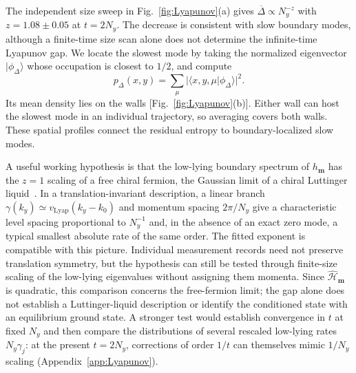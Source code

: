 \documentclass[aps,prb,10pt,twocolumn,superscriptaddress,longbibliography,floatfix]{revtex4-2}
\newcommand{\rec}{\mathbf m}   %
\begin{document}
{The independent size sweep in Fig.~\ref{fig:Lyapunov}(a) gives $\overline\Delta\propto N_y^{-z}$ with $z=1.08\pm0.05$ at $t=2N_y$. The decrease is consistent with slow boundary modes, although a finite-time size scan alone does not determine the infinite-time Lyapunov gap. We locate the slowest mode by taking the normalized eigenvector $|\phi_{\Delta}\rangle$ whose occupation is closest to $1/2$, and compute
\begin{equation}
 p_{\Delta}(x,y)=\sum_\mu|\langle x,y,\mu|\phi_{\Delta}\rangle|^2.
 \label{eq:SlowestModeDensity}
\end{equation}
Its mean density lies on the walls [Fig.~\ref{fig:Lyapunov}(b)]. Either wall can host the slowest mode in an individual trajectory, so averaging covers both walls. These spatial profiles connect the residual entropy to boundary-localized slow modes.

A useful working hypothesis is that the low-lying boundary spectrum of $h_{\rec}$ has the $z=1$ scaling of a free chiral fermion, the Gaussian limit of a chiral Luttinger liquid~\cite{Wen1995Edge}. In a translation-invariant description, a linear branch $\gamma(k_y)\simeq v_{\mathrm{Lyap}}(k_y-k_0)$ and momentum spacing $2\pi/N_y$ give a characteristic level spacing proportional to $N_y^{-1}$ and, in the absence of an exact zero mode, a typical smallest absolute rate of the same order. The fitted exponent is compatible with this picture. Individual measurement records need not preserve translation symmetry, but the hypothesis can still be tested through finite-size scaling of the low-lying eigenvalues without assigning them momenta. Since $\hat{\mathcal H}_{\rec}$ is quadratic, this comparison concerns the free-fermion limit; the gap alone does not establish a Luttinger-liquid description or identify the conditioned state with an equilibrium ground state. A stronger test would establish convergence in $t$ at fixed $N_y$ and then compare the distributions of several rescaled low-lying rates $N_y\gamma_j$: at the present $t=2N_y$, corrections of order $1/t$ can themselves mimic $1/N_y$ scaling (Appendix~\ref{app:Lyapunov}).
}
\end{document}
